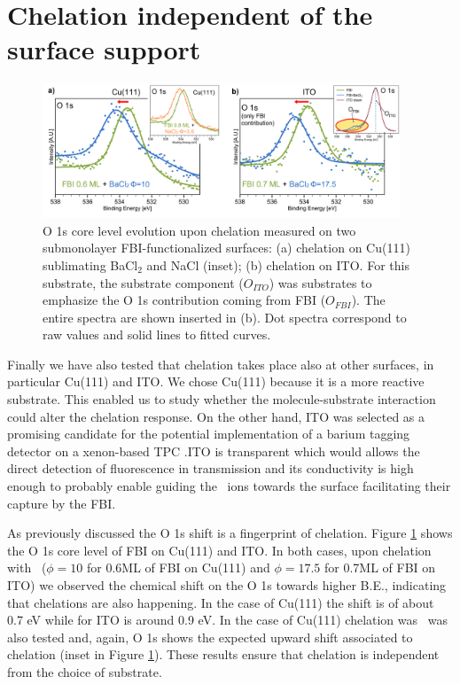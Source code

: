 \documentclass[aps,prl,reprint,longbibliography,superscriptaddress, english]{revtex4-1}
\def\BappCl{BaCl$_2$ }
\begin{document}
\section{Chelation independent of the surface support}


\begin{figure}[ht!]
	\includegraphics[width=0.95\textwidth]{figures/Figure_5.png}
	\caption{\label{XPS_FBI_Cu_ITO} 
    O 1s core level evolution upon chelation measured on two submonolayer FBI-functionalized surfaces: (a) chelation on Cu(111) sublimating \BappCl and NaCl (inset); (b) chelation on ITO. For this substrate, the substrate component (${O_{ITO}}$) was substrates to emphasize the O 1s contribution coming from FBI (${O_{FBI}}$). The entire spectra are shown inserted in (b). Dot spectra correspond to raw values and solid lines to fitted curves.}
\end{figure} 

Finally we have also tested that chelation takes place also at other surfaces, in particular Cu(111) and ITO. We chose Cu(111) because it is a more reactive substrate. This enabled us to study whether the molecule-substrate interaction could alter the chelation response. On the other hand, ITO was selected as a promising candidate for the potential implementation of a barium tagging detector on a xenon-based TPC \cite{rivilla_fluorescent_2020}.ITO is transparent which would allows the direct detection of fluorescence in transmission and its conductivity is high enough to probably enable guiding the \Bapp\ ions towards the surface facilitating their capture by the FBI. 

As previously discussed the O 1s shift is a fingerprint of chelation. Figure \ref{XPS_FBI_Cu_ITO} shows the O 1s core level of FBI on Cu(111) and ITO. In both cases, upon chelation with \Bapp\ ($\phi = 10$ for 0.6ML of FBI on Cu(111) and $\phi = 17.5$ for 0.7ML of FBI on ITO) we observed the chemical shift on the O 1s towards higher B.E., indicating that chelations are also happening. In the case of Cu(111) the shift is of about 0.7 eV while for ITO is around 0.9 eV. In the case of Cu(111) chelation was \Nap\ was also tested and, again, O 1s shows the expected upward shift associated to chelation (inset in Figure \ref{XPS_FBI_Cu_ITO}). These results ensure that chelation is independent from the choice of substrate.
\end{document}
